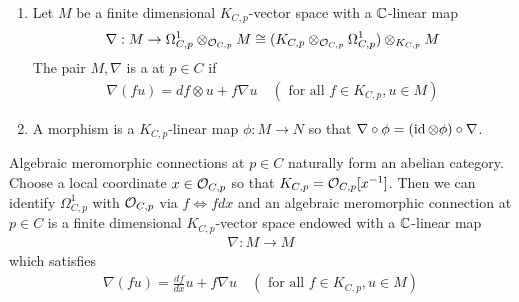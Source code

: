 \begin{definition}
	\hfill
	\begin{enumerate}
		\item Let $M$ be a finite dimensional $K_{C,p}$-vector space with a $\mathbb{C}$-linear map
		      \begin{align*}
			      \nabla: M\to \Omega^1_{C,p}\otimes_{{\mathcal{O}}_{C,p}} M \cong (K_{C,p}\otimes_{{\mathcal{O}}_{C,p}} \Omega^1_{C,p})\otimes_{K_{C,p}} M
		      \end{align*}
		      The pair $M,\nabla$ is a  at $p\in C$ if \begin{align*}
			      \nabla(fu) = df\otimes u + f\nabla u \quad (\text{ for all } f\in K_{C,p}, u\in M)
		      \end{align*}
		\item A morphism is a $K_{C,p}$-linear map $\phi:M\to N$ so that $\nabla\circ\phi = (\operatorname{id}\otimes\phi)\circ\nabla$.
	\end{enumerate}
\end{definition}
Algebraic meromorphic connections at $p\in C$ naturally form an abelian category.
Choose a local coordinate $x\in {\mathcal{O}}_{C,p}$ so that $K_{C,p} = {\mathcal{O}}_{C,p}[x^{-1}]$.
Then we can identify $\Omega^1_{C,p}$ with ${\mathcal{O}}_{C,p}$ via $f \iff f dx$
and an algebraic meromorphic connection at $p\in C$ is a finite dimensional $K_{C,p}$-vector space
endowed with a $\mathbb{C}$-linear map \begin{align*}
	\nabla: M\to M
\end{align*} which satisfies \begin{align*}
	\nabla(fu) = \frac{df}{dx}u + f\nabla u \quad (\text{ for all } f\in K_{C,p}, u\in M)
\end{align*}


